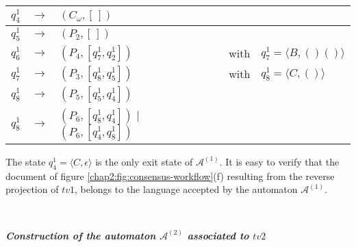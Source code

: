 \begin{table}[ht]
\begin{tabular}[t]{|lcp{5.7cm}|lcp{5cm}|}
	$q_{4}^{1}$ & $\longrightarrow$ & $(C_\omega,[\,])$ & & &\\
	\hline
	
	$q_{5}^{1}$ & $\longrightarrow$ & $(P_{2}, [\,])$ & & &\\
	\hline
	
	$q_{6}^{1}$ & $\longrightarrow$ & $(P_{4}, [q_{7}^{1}, q_{2}^{1}])$ & & with & $q_{7}^{1}=\langle B,()() \rangle$\\
	\hline
	
	$q_{7}^{1}$ & $\longrightarrow$ & $(P_{3}, [q_{8}^{1}, q_{5}^{1}])$ & & with & $q_{8}^{1}=\langle C,() \rangle$\\
	\hline
	
	$q_{8}^{1}$ & $\longrightarrow$ & $(P_{5}, [q_{5}^{1}, q_{4}^{1}])$ & & &\\
	\hline
	
	$q_{8}^{1}$ & $\longrightarrow$ & $(P_{6}, [q_{8}^{1}, q_{4}^{1}])$ | $(P_{6}, [q_{4}^{1}, q_{8}^{1}])$ & & &\\
	\hline
	\end{tabular}
\end{table}
The state $q_{4}^{1}=\langle C,\epsilon \rangle$ is the only exit state of  $\mathcal{A}^{(1)}$.
It is easy to verify that the document of figure \ref{chap2:fig:consensus-workflow}(f) resulting from the reverse projection of $tv1$, belongs to the language accepted by the automaton $\mathcal{A}^{(1)}$.

~

\noindent\textbf{\textit{Construction of the automaton $\mathcal{A}^{(2)}$ associated to $tv2$}}

